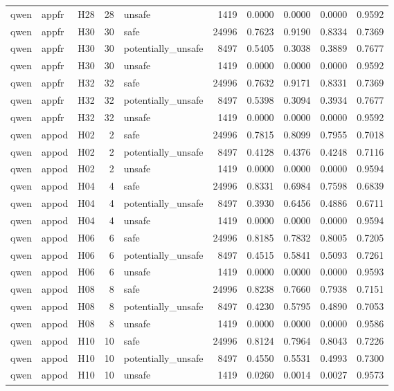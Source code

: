 \begin{table}[tbp]
\begin{tabular}{lllrlrrrrr}
qwen & appfr & H28 & 28 & unsafe & 1419 & 0.0000 & 0.0000 & 0.0000 & 0.9592 \\
qwen & appfr & H30 & 30 & safe & 24996 & 0.7623 & 0.9190 & 0.8334 & 0.7369 \\
qwen & appfr & H30 & 30 & potentially\_unsafe & 8497 & 0.5405 & 0.3038 & 0.3889 & 0.7677 \\
qwen & appfr & H30 & 30 & unsafe & 1419 & 0.0000 & 0.0000 & 0.0000 & 0.9592 \\
qwen & appfr & H32 & 32 & safe & 24996 & 0.7632 & 0.9171 & 0.8331 & 0.7369 \\
qwen & appfr & H32 & 32 & potentially\_unsafe & 8497 & 0.5398 & 0.3094 & 0.3934 & 0.7677 \\
qwen & appfr & H32 & 32 & unsafe & 1419 & 0.0000 & 0.0000 & 0.0000 & 0.9592 \\
qwen & appod & H02 & 2 & safe & 24996 & 0.7815 & 0.8099 & 0.7955 & 0.7018 \\
qwen & appod & H02 & 2 & potentially\_unsafe & 8497 & 0.4128 & 0.4376 & 0.4248 & 0.7116 \\
qwen & appod & H02 & 2 & unsafe & 1419 & 0.0000 & 0.0000 & 0.0000 & 0.9594 \\
qwen & appod & H04 & 4 & safe & 24996 & 0.8331 & 0.6984 & 0.7598 & 0.6839 \\
qwen & appod & H04 & 4 & potentially\_unsafe & 8497 & 0.3930 & 0.6456 & 0.4886 & 0.6711 \\
qwen & appod & H04 & 4 & unsafe & 1419 & 0.0000 & 0.0000 & 0.0000 & 0.9594 \\
qwen & appod & H06 & 6 & safe & 24996 & 0.8185 & 0.7832 & 0.8005 & 0.7205 \\
qwen & appod & H06 & 6 & potentially\_unsafe & 8497 & 0.4515 & 0.5841 & 0.5093 & 0.7261 \\
qwen & appod & H06 & 6 & unsafe & 1419 & 0.0000 & 0.0000 & 0.0000 & 0.9593 \\
qwen & appod & H08 & 8 & safe & 24996 & 0.8238 & 0.7660 & 0.7938 & 0.7151 \\
qwen & appod & H08 & 8 & potentially\_unsafe & 8497 & 0.4230 & 0.5795 & 0.4890 & 0.7053 \\
qwen & appod & H08 & 8 & unsafe & 1419 & 0.0000 & 0.0000 & 0.0000 & 0.9586 \\
qwen & appod & H10 & 10 & safe & 24996 & 0.8124 & 0.7964 & 0.8043 & 0.7226 \\
qwen & appod & H10 & 10 & potentially\_unsafe & 8497 & 0.4550 & 0.5531 & 0.4993 & 0.7300 \\
qwen & appod & H10 & 10 & unsafe & 1419 & 0.0260 & 0.0014 & 0.0027 & 0.9573 \\

\end{tabular}
\end{table}
